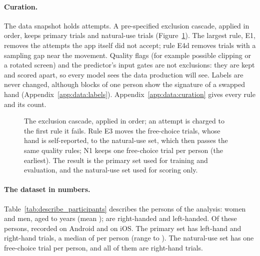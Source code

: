 \paragraph{Curation.} The data snapshot holds  attempts. A pre-specified exclusion
cascade, applied in order, keeps  primary trials and 
natural-use trials (Figure~\ref{fig:S2_02_exclusion_flow}). The largest rule, E1, removes the
 attempts the app itself did not accept; rule E4d removes 
trials with a sampling gap near the movement. Quality flags (for example possible clipping or a rotated screen) and
the predictor's input gates are not exclusions: they are kept and scored apart, so every model sees the data
production will see. Labels are never changed, although  blocks of one person
show the signature of a swapped hand (Appendix~\ref{app:data:labels}). Appendix~\ref{app:data:curation} gives every rule and its count.

\begin{figure}[htbp]
\centering
{}
\caption{The exclusion cascade, applied in order; an attempt is charged to the first rule it fails. Rule E3 moves
the free-choice trials, whose hand is self-reported, to the natural-use set, which then passes the same quality
rules; N1 keeps one free-choice trial per person (the earliest). The result is the primary set used for training
and evaluation, and the natural-use set used for scoring only.}
\label{fig:S2_02_exclusion_flow}
\end{figure}

\paragraph{The dataset in numbers.} Table~\ref{tab:describe_participants} describes the 
persons of the analysis:  women and  men, aged  to
 years (mean );  are right-handed and
 left-handed. Of these persons,  recorded on Android and
 on iOS. The primary set has  left-hand and
 right-hand trials, a median of  per person (range
 to ). The natural-use set has one
free-choice trial per person, and all  of them are right-hand trials.

